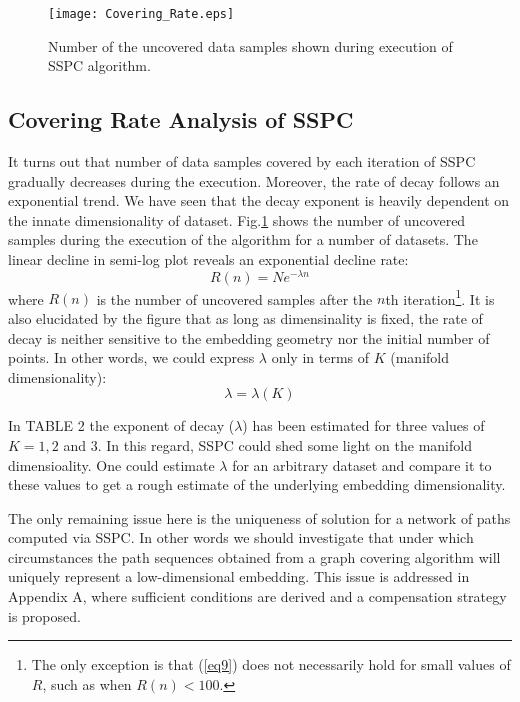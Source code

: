 \documentclass[10pt,journal,cspaper,compsoc]{IEEEtran}
\let\MYoriglatexcaption\caption
\renewcommand{\caption}[2][\relax]{\MYoriglatexcaption[#2]{#2}}
\begin{document}
\begin{figure}[b]
\centering
    \texttt{[image: Covering\_Rate.eps]}
    \caption{{\small Number of the uncovered data samples shown during execution of SSPC algorithm.}}
    \label{fig_5_2}
\end{figure}

\subsection{Covering Rate Analysis of SSPC}
It turns out that number of data samples covered by each iteration of SSPC gradually decreases during the execution. Moreover, the rate of decay follows an exponential trend. We have seen that the decay exponent is heavily dependent on the innate dimensionality of dataset. Fig.\ref{fig_5_2} shows the number of uncovered samples during the execution of the algorithm for a number of datasets. The linear decline in semi-log plot reveals an exponential decline rate:
\begin{equation}
\label{eq9}
R(n)=Ne^{-\lambda n}
\end{equation}
where $R(n)$ is the number of uncovered samples after the $n$th iteration\footnote{The only exception is that (\ref{eq9}) does not necessarily hold for small values of $R$, such as when $R(n)<100$.}. It is also elucidated by the figure that as long as dimensinality is fixed, the rate of decay is neither sensitive to the embedding geometry nor the initial number of points. In other words, we could express $\lambda$ only in terms of $K$ (manifold dimensionality):
\begin{equation}
\lambda=\lambda{(K)}
\label{eq10}
\end{equation}

In TABLE 2 the exponent of decay ($\lambda$) has been estimated for three values of $K=1, 2$ and $3$. In this regard, SSPC could shed some light on the manifold dimensioality. One could estimate $\lambda$ for an arbitrary dataset and compare it to these values to get a rough estimate of the underlying embedding dimensionality.

The only remaining issue here is the uniqueness of solution for a network of paths computed via SSPC. In other words we should investigate that under which circumstances the path sequences obtained from a graph covering algorithm will uniquely represent a low-dimensional embedding. This issue is addressed in Appendix A, where sufficient conditions are derived and a compensation strategy is proposed.
\end{document}
